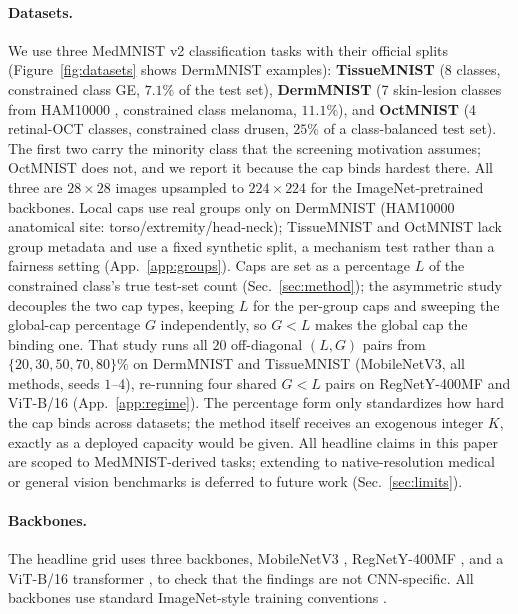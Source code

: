 \documentclass[10pt]{article}
\begin{document}
\paragraph{Datasets.}
We use three MedMNIST v2 \citep{yang2023medmnist} classification tasks with
their official splits (Figure~\ref{fig:datasets} shows DermMNIST examples):
\textbf{TissueMNIST} (8 classes, constrained class GE, $7.1\%$ of the test
set), \textbf{DermMNIST} (7 skin-lesion classes from HAM10000
\citep{tschandl2018ham10000}, constrained class melanoma, $11.1\%$), and
\textbf{OctMNIST} (4 retinal-OCT classes, constrained class drusen, $25\%$
of a class-balanced test set). The first two carry the minority class that
the screening motivation assumes; OctMNIST does not, and we report it
because the cap binds hardest there. All three are $28{\times}28$ images
upsampled to $224{\times}224$ for the ImageNet-pretrained backbones. Local
caps use real groups only on DermMNIST (HAM10000 anatomical site:
torso/extremity/head-neck); TissueMNIST and OctMNIST lack group metadata and
use a fixed synthetic split, a mechanism test rather than a fairness
setting (App.~\ref{app:groups}). Caps are set as a percentage $L$ of the
constrained class's true test-set count (Sec.~\ref{sec:method}); the
asymmetric study decouples the two cap types, keeping $L$ for the per-group
caps and sweeping the global-cap percentage $G$ independently, so $G{<}L$
makes the global cap the binding one. That study runs all $20$ off-diagonal
$(L,G)$ pairs from $\{20,30,50,70,80\}\%$ on DermMNIST and TissueMNIST
(MobileNetV3, all methods, seeds $1$--$4$), re-running four shared $G{<}L$
pairs on RegNetY-400MF and ViT-B/16 (App.~\ref{app:regime}). The
percentage form only standardizes how hard the cap binds across datasets;
the method itself receives an exogenous integer $K$, exactly as a deployed
capacity would be given. All headline claims in this paper are scoped to
MedMNIST-derived tasks; extending to native-resolution medical or general
vision benchmarks is deferred to future work (Sec.~\ref{sec:limits}).

\paragraph{Backbones.}
The headline grid uses three backbones, MobileNetV3
\citep{howard2019searching}, RegNetY-400MF \citep{radosavovic2020designing},
and a ViT-B/16 transformer \citep{dosovitskiy2020image}, to check that the
findings are not CNN-specific. All backbones use standard ImageNet-style
training conventions \citep{he2016deep}.
\end{document}
